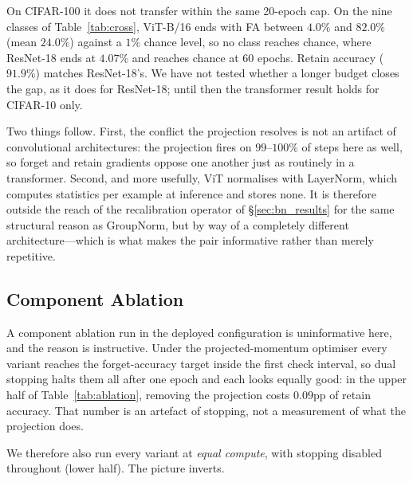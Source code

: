 \documentclass{article}
\newcommand{\rev}[1]{{\color{revisedB}#1}}
\theoremstyle{remark}
\theoremstyle{plain}
\begin{document}
\rev{On CIFAR-100 it does not transfer within the same 20-epoch cap. On the nine
classes of Table~\ref{tab:cross}, ViT-B/16 ends with FA between $4.0\%$ and
$82.0\%$ (mean $24.0\%$) against a $1\%$ chance level, so no class reaches
chance, where ResNet-18 ends at $4.07\%$ and reaches chance at 60 epochs.
Retain accuracy ($91.9\%$) matches ResNet-18's. We have not tested whether a
longer budget closes the gap, as it does for ResNet-18; until then the
transformer result holds for CIFAR-10 only.}

Two things follow. First, the conflict the projection resolves is not an artifact
of convolutional architectures: the projection fires on $99$--$100\%$ of steps
here as well, so forget and retain gradients oppose one another just as
routinely in a transformer. Second, and more usefully,
ViT normalises with LayerNorm, which computes statistics per example at
inference and stores none. It is therefore outside the reach of the
recalibration operator of \S\ref{sec:bn_results} for the same structural reason
as GroupNorm, but by way of a completely different architecture---which is what
makes the pair informative rather than merely repetitive.

\subsection{Component Ablation}\label{sec:ablation}

A component ablation run in the deployed configuration is uninformative here,
and the reason is instructive. Under the projected-momentum optimiser every
variant reaches the forget-accuracy target inside the first check interval, so
dual stopping halts them all after one epoch and each looks equally good: in the
upper half of Table~\ref{tab:ablation}, removing the projection costs
$0.09$pp of retain accuracy. That number is an artefact of stopping, not a
measurement of what the projection does.

We therefore also run every variant at \emph{equal compute}, with stopping
disabled throughout (lower half). The picture inverts.
\end{document}
